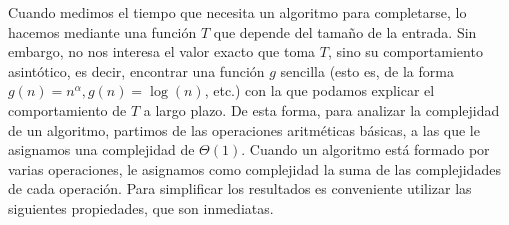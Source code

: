 \documentclass{article}
\begin{document}

Cuando medimos el tiempo que necesita un algoritmo para completarse, lo hacemos mediante una función $T$ que depende del tamaño de la entrada. Sin embargo, no nos interesa el valor exacto que toma $T$, sino su comportamiento asintótico, es decir, encontrar una función $g$ sencilla (esto es, de la forma $g(n) = n^\alpha, g(n) = \log(n)$, etc.) con la que podamos explicar el comportamiento de $T$ a largo plazo. De esta forma, para analizar la complejidad de un algoritmo, partimos de las operaciones aritméticas básicas, a las que le asignamos una complejidad de $\Theta(1)$. Cuando un algoritmo está formado por varias operaciones, le asignamos como complejidad la suma de las complejidades de cada operación. Para simplificar los resultados es conveniente utilizar las siguientes propiedades, que son inmediatas.
\end{document}
